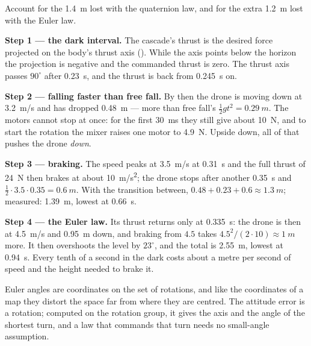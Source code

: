 \begin{example}
\label{ex:geometric-height}
Account for the \SI{1.4}{m} lost with the quaternion law, and for the extra \SI{1.2}{m} lost with the Euler law.

\textbf{Step 1 — the dark interval.} The cascade's thrust is the desired force projected on the body's thrust axis (). While the axis points below the horizon the projection is negative and the commanded thrust is zero. The thrust axis passes $90^\circ$ after \SI{0.23}{s}, and the thrust is back from \SI{0.245}{s} on.

\textbf{Step 2 — falling faster than free fall.} By then the drone is moving down at \SI{3.2}{m/s} and has dropped \SI{0.48}{m} — more than free fall's $\tfrac12 g t^2 = \SI{0.29}{m}$. The motors cannot stop at once: for the first \SI{30}{ms} they still give about \SI{10}{N}, and to start the rotation the mixer raises one motor to \SI{4.9}{N}. Upside down, all of that pushes the drone \emph{down}.

\textbf{Step 3 — braking.} The speed peaks at \SI{3.5}{m/s} at \SI{0.31}{s} and the full thrust of \SI{24}{N} then brakes at about \SI{10}{m/s^2}; the drone stops after another \SI{0.35}{s} and $\tfrac12 \cdot 3.5 \cdot 0.35 = \SI{0.6}{m}$. With the transition between, $0.48 + 0.23 + 0.6 \approx \SI{1.3}{m}$; measured: \SI{1.39}{m}, lowest at \SI{0.66}{s}.

\textbf{Step 4 — the Euler law.} Its thrust returns only at \SI{0.335}{s}: the drone is then at \SI{4.5}{m/s} and \SI{0.95}{m} down, and braking from $4.5$ takes $4.5^2/(2 \cdot 10) \approx \SI{1}{m}$ more. It then overshoots the level by $23^\circ$, and the total is \SI{2.55}{m}, lowest at \SI{0.94}{s}. Every tenth of a second in the dark costs about a metre per second of speed and the height needed to brake it.
\end{example}

\begin{keyidea}
Euler angles are coordinates on the set of rotations, and like the coordinates of a map they distort the space far from where they are centred. The attitude error is a rotation; computed on the rotation group, it gives the axis and the angle of the shortest turn, and a law that commands that turn needs no small-angle assumption.
\end{keyidea}

